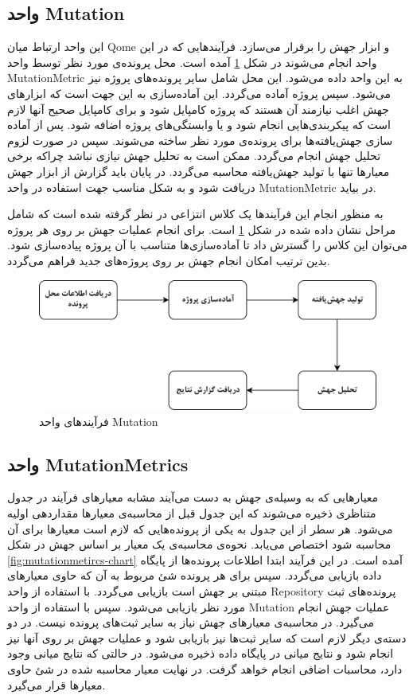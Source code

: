 \subsection{واحد Mutation}
این واحد ارتباط میان Qome و ابزار جهش را برقرار می‌سازد. فرآیندهایی که در این واحد انجام می‌شوند در شکل \ref{fig:mutation-chart} آمده است. محل پرونده‌ی مورد نظر توسط واحد MutationMetric به این واحد داده می‌شود. این محل شامل سایر پرونده‌های پروژه نیز می‌شود. سپس پروژه آماده می‌گردد. این آماده‌سازی به این جهت است که ابزارهای جهش اغلب نیازمند آن هستند که پروژه کامپایل شود و برای  کامپایل صحیح آنها لازم است که پیکربندی‌هایی انجام شود و یا وابستگی‌های پروژه اضافه شود. پس از آماده سازی جهش‌یافته‌ها برای پرونده‌ی مورد نظر ساخته می‌شوند. سپس در صورت لزوم تحلیل جهش انجام می‌گردد. ممکن است به تحلیل جهش نیازی نباشد چراکه برخی معیارها تنها با تولید جهش‌یافته محاسبه می‌گردد. در پایان باید گزارش از ابزار جهش دریافت شود و به شکل مناسب جهت استفاده در واحد MutationMetric در بیاید. 

به منظور انجام این فرآیندها یک کلاس انتزاعی در نظر گرفته شده است که شامل مراحل نشان داده شده در شکل \ref{fig:mutation-chart}  است. برای انجام عملیات جهش بر روی هر پروژه می‌توان این کلاس را گسترش داد تا آماده‌سازی‌ها متناسب با آن پروژه پیاده‌سازی شود. بدین ترتیب امکان انجام جهش بر روی پروژه‌های جدید فراهم می‌گردد.

\begin{figure}[H]
	\centering
	\includegraphics[width=.8\textwidth]{img/method/mutation-chart.png}
	\caption{ فرآیند‌های واحد Mutation}
	\label{fig:mutation-chart}
\end{figure}

\subsection{واحد MutationMetrics}

معیارهایی که به وسیله‌ی جهش به دست می‌آیند مشابه معیارهای فرآیند در جدول متناظری ذخیره می‌شوند که  این جدول قبل از محاسبه‌ی معیارها مقداردهی اولیه می‌شود. هر سطر از این جدول به یکی از پرونده‌هایی که لازم است معیارها برای آن محاسبه شود اختصاص می‌یابد.  نحوه‌ی محاسبه‌ی یک معیار بر اساس جهش در شکل \ref{fig:mutationmetircs-chart} آمده است. در این فرآیند ابتدا اطلاعات پرونده‌ها از پایگاه داده بازیابی می‌گردد. سپس برای هر پرونده شئ مربوط به آن که حاوی معیارهای  مبتنی  بر جهش است بازیابی می‌گردد. با استفاده از واحد Repository‌ پرونده‌های ثبت مورد نظر بازیابی می‌شود. سپس با استفاده از واحد Mutation عملیات جهش انجام می‌گیرد. در محاسبه‌ی معیارهای جهش نیاز به سایر ثبت‌های پرونده نیست. در دو دسته‌ی دیگر لازم است که سایر ثبت‌ها نیز بازیابی شود و عملیات جهش بر روی آنها نیز انجام شود و نتایج میانی در پایگاه داده ذخیره می‌شود.  در حالتی که نتایج میانی وجود دارد، محاسبات اضافی انجام خواهد گرفت.  در نهایت معیار محاسبه شده در شئ حاوی معیارها قرار می‌گیرد. 

